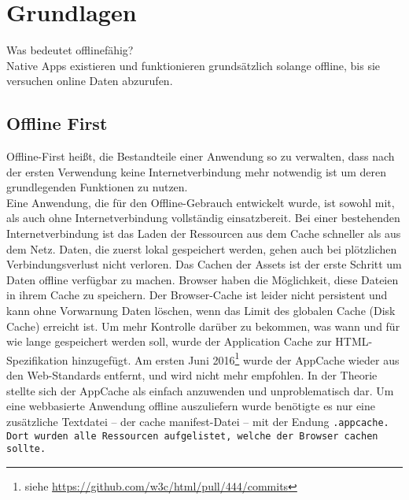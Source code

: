 \chapter{\label{chap:grundlagen}Grundlagen}
Was bedeutet offlinefähig?\\
Native \Glspl{App} existieren und funktionieren grundsätzlich solange offline, bis sie versuchen online Daten abzurufen.
%
%
\section{Offline First}
Offline-First heißt, die Bestandteile einer Anwendung so zu verwalten, dass nach der ersten Verwendung keine Internetverbindung mehr notwendig ist um deren grundlegenden Funktionen zu nutzen.\\
Eine Anwendung, die für den Offline-Gebrauch entwickelt wurde, ist sowohl mit, als auch ohne Internetverbindung vollständig einsatzbereit. Bei einer bestehenden Internetverbindung ist das Laden der Ressourcen aus dem Cache schneller als aus dem Netz. Daten, die zuerst lokal gespeichert werden, gehen auch bei plötzlichen Verbindungsverlust nicht verloren.
Das Cachen der \gls{Assets} ist der erste Schritt um Daten offline verfügbar zu machen. Browser haben die Möglichkeit, diese Dateien in ihrem Cache zu speichern. Der Browser-Cache ist leider nicht persistent und kann ohne Vorwarnung Daten löschen, wenn das Limit des globalen Cache (Disk Cache) erreicht ist.
Um mehr Kontrolle darüber zu bekommen, was wann und für wie lange gespeichert werden soll, wurde der Application Cache zur HTML-Spezifikation hinzugefügt.
Am ersten Juni 2016\footnote{siehe \url{https://github.com/w3c/html/pull/444/commits}} wurde der AppCache wieder aus den Web-Standards entfernt, und wird nicht mehr empfohlen.
In der Theorie stellte sich der AppCache als einfach anzuwenden und unproblematisch dar. Um eine webbasierte Anwendung offline auszuliefern wurde benötigte es nur eine zusätzliche Textdatei -- der cache manifest-Datei -- mit der Endung \tt{.appcache}. Dort wurden alle Ressourcen aufgelistet, welche der Browser cachen sollte.
